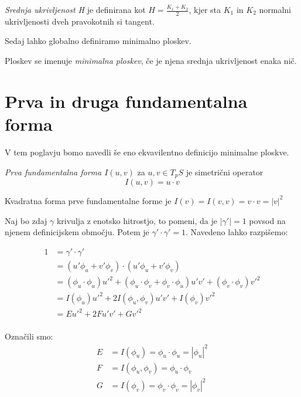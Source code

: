 \documentclass[mat1]{fmfdelo}
\begin{document}
\begin{definicija}
    \emph{Srednja ukrivljenost H} je definirana kot $H = \frac{ K_1 + K_2 }{2}$, kjer sta $K_1$ in $K_2$ normalni ukrivljenosti dveh pravokotnih si tangent.
\end{definicija}

Sedaj lahko globalno definiramo minimalno ploskev.

\begin{definicija}
    Ploskev se imenuje \emph{minimalna ploskev}, če je njena srednja ukrivljenost enaka nič.
\end{definicija}


\section{Prva in druga fundamentalna forma}

V tem poglavju bomo navedli še eno ekvavilentno definicijo minimalne ploskve.

\begin{definicija}
    \emph{Prva fundamentalna forma $I(u, v)$} za $u, v \in T_p S$ je simetrični operator $$I(u, v) = u \cdot v$$
\end{definicija}

Kvadratna forma prve fundamentalne forme je $I(v) = I(v, v) = v \cdot v = \left\lvert v \right\rvert^2$ 

Naj bo zdaj $\gamma$ krivulja z enotsko hitrostjo, to pomeni, da je $\left\lvert \gamma' \right\rvert = 1$ povsod na njenem definicijskem območju.
Potem je $\gamma' \cdot \gamma' = 1$.
Navedeno lahko razpišemo:

\begin{align*}
    1 &= \gamma' \cdot \gamma' \\
    &= (u' \phi_u + v' \phi_v) \cdot (u' \phi_u + v' \phi_v)\\
    &= (\phi_u \cdot \phi_u) u'^2 + (\phi_u \cdot \phi_v + \phi_v \cdot \phi_u) u' v' + (\phi_v \cdot \phi_v) v'^2  \\
    &= I(\phi_u) u'^2 + 2 I(\phi_u, \phi_v) u' v' + I(\phi_v) v'^2\\
    &= E u'^2 + 2F u' v' + G v'^2\\
\end{align*}

Označili smo:
\begin{align*}
    E &= I(\phi_u) = \phi_u \cdot \phi_u = \left\lvert \phi_u \right\rvert^2 \\
    F &= I(\phi_u, \phi_v) = \phi_u \cdot \phi_v \\
    G &= I(\phi_v) = \phi_v \cdot \phi_v = \left\lvert \phi_v \right\rvert^2
\end{align*}
\end{document}
